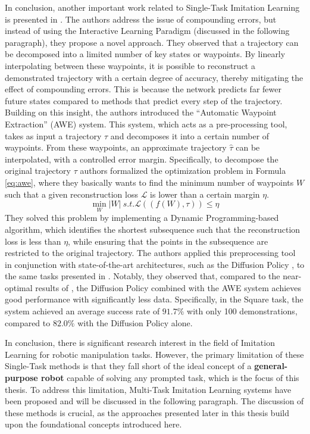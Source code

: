 In conclusion, another important work related to Single-Task Imitation Learning is presented in \cite{shi2023waypoint}. The authors address the issue of compounding errors, but instead of using the Interactive Learning Paradigm (discussed in the following paragraph), they propose a novel approach. They observed that a trajectory can be decomposed into a limited number of key states or waypoints. By linearly interpolating between these waypoints, it is possible to reconstruct a demonstrated trajectory with a certain degree of accuracy, thereby mitigating the effect of compounding errors. This is because the network predicts far fewer future states compared to methods that predict every step of the trajectory. Building on this insight, the authors introduced the ``Automatic Waypoint Extraction'' (AWE) system. This system, which acts as a pre-processing tool, takes as input a trajectory $\tau$ and decomposes it into a certain number of waypoints. From these waypoints, an approximate trajectory $\hat{\tau}$ can be interpolated, with a controlled error margin.
Specifically, to decompose the original trajectory $\tau$ authors formalized the optimization problem in Formula \ref{eq:awe}, where they basically wants to find the minimum number of waypoints $W$ such that a given reconstruction loss $\mathcal{L}$ is lower than a certain margin $\eta$.
\begin{equation}
    \label{eq:awe}
    \min_{W} |W|  \ s.t. \mathcal{L}((f(W), \tau)) \le \eta
\end{equation}
They solved this problem by implementing a Dynamic Programming-based algorithm, which identifies the shortest subsequence such that the reconstruction loss is less than $\eta$, while ensuring that the points in the subsequence are restricted to the original trajectory. The authors applied this preprocessing tool in conjunction with state-of-the-art architectures, such as the Diffusion Policy \cite{cheng2023diffusion}, to the same tasks presented in \cite{mandlekar2022matters}. Notably, they observed that, compared to the near-optimal results of \cite{cheng2023diffusion}, the Diffusion Policy combined with the AWE system achieves good performance with significantly less data. Specifically, in the Square task, the system achieved an average success rate of $91.7\%$ with only 100 demonstrations, compared to $82.0\%$ with the Diffusion Policy alone.

In conclusion, there is significant research interest in the field of Imitation Learning for robotic manipulation tasks. However, the primary limitation of these Single-Task methods is that they fall short of the ideal concept of a \textbf{general-purpose robot} capable of solving any prompted task, which is the focus of this thesis. To address this limitation, Multi-Task Imitation Learning systems have been proposed and will be discussed in the following paragraph. The discussion of these methods is crucial, as the approaches presented later in this thesis build upon the foundational concepts introduced here.
